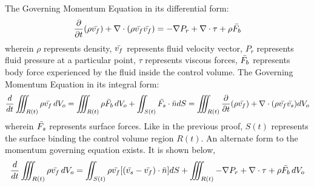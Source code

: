 \documentclass[class=report, 12pt, crop=false]{standalone}
\begin{document}
\begin{center}
\begin{comment}
\end{comment}
The Governing Momentum Equation in its differential form:
$$\frac{\partial}{\partial t} (\rho \bar{v_f}) + \nabla \cdot (\rho\bar{v_f}\bar{v_f}) = -\nabla P_r + \nabla \cdot \tau + \rho \bar{F_b}$$
wherein $\rho$ represents density, $\bar{v_f}$ represents fluid velocity vector, $P_r$ represents fluid pressure at a particular point, $\tau$ represents viscous forces, $\bar{F_b}$ represents body force experienced by the fluid inside the control volume. The Governing Momentum Equation in its integral form:
$$\frac{d}{dt}\iiint_{R(t)}\rho \bar{v_f} \,dV_o = \iiint_{R(t)}\rho \bar{F_b} \,dV_o + \iint_{S(t)} \bar{F_s} \cdot \bar{n}dS = \iiint_{R(t)}\frac{\partial}{\partial t}(\rho \bar{v_f}) + \nabla \cdot (\rho\bar{v_f}\bar{v_s})dV_o$$
wherein $\bar{F_s}$ represents surface forces. Like in the previous proof, $S(t)$ represents the surface binding the control volume region $R(t)$. An alternate form to the momentum governing equation exists. It is shown below,
$$\frac{d}{dt}\iiint_{R(t)}\rho \bar{v_f} \,dV_o = \iint_{S(t)}\rho \bar{v_f}[(\bar{v_s}-\bar{v_f})\cdot\bar{n}]dS + \iiint_{R(t)}-\nabla P_r + \nabla \cdot \tau + \rho \bar{F_b}\,dV_o$$

\end{center}
\end{document}
